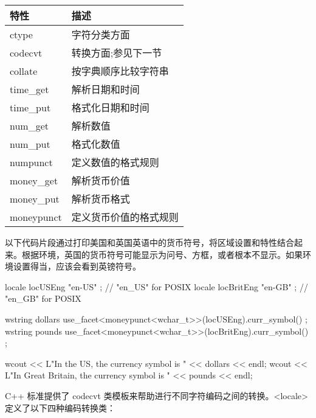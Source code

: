 \begin{longtable}{|l|l|}
\hline
\textbf{特性} & \textbf{描述}                             \\ \hline
\endfirsthead
%
\endhead
%
ctype          & 字符分类方面                  \\ \hline
codecvt        & 转换方面;参见下一节              \\ \hline
collate        & 按字典顺序比较字符串              \\ \hline
time\_get      & 解析日期和时间                          \\ \hline
time\_put      & 格式化日期和时间                       \\ \hline
num\_get       & 解析数值                           \\ \hline
num\_put       & 格式化数值                        \\ \hline
numpunct       & 定义数值的格式规则  \\ \hline
money\_get     & 解析货币价值                          \\ \hline
money\_put     & 解析货币格式                       \\ \hline
moneypunct     & 定义货币价值的格式规则 \\ \hline
\end{longtable}

以下代码片段通过打印美国和英国英语中的货币符号，将区域设置和特性结合起来。根据环境，英国的货币符号可能显示为问号、方框，或者根本不显示。如果环境设置得当，应该会看到英镑符号。

\begin{cpp}
locale locUSEng { "en-US" }; // "en_US" for POSIX
locale locBritEng { "en-GB" }; // "en_GB" for POSIX

wstring dollars { use_facet<moneypunct<wchar_t>>(locUSEng).curr_symbol() };
wstring pounds { use_facet<moneypunct<wchar_t>>(locBritEng).curr_symbol() };

wcout << L"In the US, the currency symbol is " << dollars << endl;
wcout << L"In Great Britain, the currency symbol is " << pounds << endl;
\end{cpp}


C++ 标准提供了 codecvt 类模板来帮助进行不同字符编码之间的转换。<locale> 定义了以下四种编码转换类：

